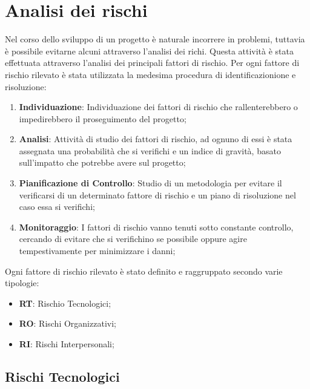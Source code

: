 \section{Analisi dei rischi}
	Nel corso dello sviluppo di un progetto è naturale incorrere in problemi, tuttavia è possibile evitarne alcuni attraverso l'analisi dei richi. Questa attività è stata effettuata attraverso l'analisi dei principali fattori di rischio. Per ogni fattore di rischio rilevato è stata utilizzata la medesima procedura di identificazionione e risoluzione:
	\begin{enumerate}
		\item \textbf{Individuazione}: Individuazione dei fattori di rischio che rallenterebbero o impedirebbero il proseguimento del progetto;
		\item \textbf{Analisi}: Attività di studio dei fattori di rischio, ad ognuno di essi è stata assegnata una probabilità che si verifichi e un indice di gravità, basato sull'impatto che potrebbe avere sul progetto;
		\item \textbf{Pianificazione di Controllo}: Studio di un metodologia per evitare il verificarsi di un determinato fattore di rischio e un piano di risoluzione nel caso essa si verifichi;
		\item \textbf{Monitoraggio}: I fattori di rischio vanno tenuti sotto constante controllo, cercando di evitare che si verifichino se possibile oppure agire tempestivamente per minimizzare i danni;
	\end{enumerate}
	Ogni fattore di rischio rilevato è stato definito e raggruppato secondo varie tipologie:
	\begin{itemize}
		\item \textbf{RT}: Rischio Tecnologici;
		\item \textbf{RO}: Rischi Organizzativi;
		\item \textbf{RI}: Rischi Interpersonali;
	\end{itemize}
	\subsection{Rischi Tecnologici}
	\def\productquality{
    		{
        		Inesperienza
			Tecnologica
			RT1,
        		La maggior parte delle tecnologie richieste nello sviluppo del progetto sono nuove per molti componenti del team, 
        		Il responsabile dovrà rilevare conoscenze e lacune dei vari componenti del team provando ad indicare una via ottimale per risolvere la mancanza di conoscenze,
        		Occorrenza: Alta 
			Pericolosità: Alta,
        		I compiti più onerasi verranno assegnati a più persone favorendo l'assistenza reciproca
    		},
	}
	

